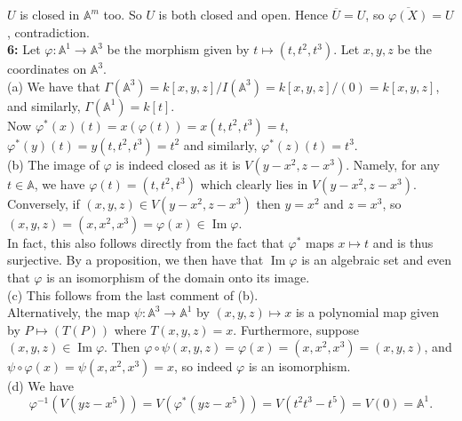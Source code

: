 \documentclass[a4paper]{article}
\DeclareMathOperator{\Ima}{Im}
\begin{document}
    $U$ is closed in $\mathbb{A}^{m}$ too. So $U$ is both closed and open.
    Hence $\overline{U} = U$, so
    $\overline{\varphi(X)} = U$, contradiction.\\
    \linebreak
    \textbf{6:} Let $\varphi  \colon \mathbb{A}^{1} \to \mathbb{A}^{3}$ be the
    morphism given by $t \mapsto \left( t, t^2, t^3 \right) $. Let
    $x,y,z$ be the coordinates on $\mathbb{A}^3$.\\
    (a) We have that $\Gamma(\mathbb{A}^3) = 
    k\left[ x,y,z \right] / I\left( \mathbb{A}^3 \right) 
    = k\left[ x,y,z \right] / (0) = k\left[ x,y,z \right] $, and similarly,
    $\Gamma(\mathbb{A}^{1}) = k\left[ t \right] $.\\
    Now $\varphi^{*}(x)(t) =
    x \left( \varphi(t) \right) = x(t,t^2,t^3) = t$,
    $\varphi^{*}(y)(t) = y \left( t,t^2,t^3 \right) =t^2$ and similarly,
    $\varphi^{*}(z)(t) = t^3$.\\
    \linebreak
    (b) The image of $\varphi$ is indeed closed as it is
    $V\left( y-x^2, z-x^3 \right) $. Namely, for any
    $t \in \mathbb{A}$, we have $\varphi(t) = \left( t, t^2, t^3 \right)
    $ which clearly lies in $V(y-x^2, z-x^3)$. Conversely, if
    $(x,y,z) \in V(y-x^2, z-x^3)$ then
    $y = x^2$ and $z = x^3$, so $(x,y,z) = (x, x^2, x^3) =
    \varphi(x) \in \Ima \varphi$.\\
    In fact, this also follows directly from the fact that
    $\varphi^{*}$ maps $x \mapsto t$ and is thus surjective. By a proposition,
    we then have that $\Ima \varphi$ is an algebraic set and even that
    $\varphi$ is an isomorphism of the domain onto its image.\\
     \linebreak
     (c) This follows from the last comment of (b).\\
     Alternatively,
     the map $\psi  \colon \mathbb{A}^3 \to \mathbb{A}^{1}$ by
     $(x,y,z) \mapsto x$ is a polynomial map given by
     $P \mapsto \left( T(P) \right) $ where $T(x,y,z) = x$. Furthermore,
     suppose $(x,y,z) \in \Ima \varphi$. Then
     $\varphi \circ \psi (x,y,z)
     = \varphi(x) = (x,x^2, x^3)
     = (x,y,z)$, and
     $\psi \circ \varphi(x)
     =\psi (x,x^2,x^3) = x$, so
     indeed $\varphi$ is an isomorphism.\\
     \linebreak
     (d) We have
     \[
     \varphi^{-1}\left( V(yz-x^5) \right) 
     = V\left( \varphi^{*}(yz-x^{5}) \right) 
     = V\left( t^2 t^3 - t^{5} \right) 
     = V(0) = \mathbb{A}^{1}.
     \] 
\end{document}
